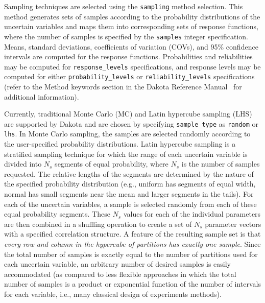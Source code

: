 Sampling techniques are selected using the \texttt{sampling}
method selection. This method generates sets of samples according to
the probability distributions of the uncertain variables and maps them
into corresponding sets of response functions, where the number of
samples is specified by the \texttt{samples} integer specification.
Means, standard deviations, coefficients of variation (COVs), and 95\%
confidence intervals are computed for the response functions.
Probabilities and reliabilities may be computed for 
\texttt{response\_levels} specifications, and response levels may be
computed for either \texttt{probability\_levels} or
\texttt{reliability\_levels} specifications (refer to the Method
keywords section in the Dakota Reference Manual~\cite{RefMan} for
additional information).

Currently, traditional Monte Carlo (MC) and Latin hypercube sampling
(LHS) are supported by Dakota and are chosen by specifying
\texttt{sample\_type} as \texttt{random} or \texttt{lhs}. In Monte
Carlo sampling, the samples are selected randomly according to the
user-specified probability distributions. Latin hypercube sampling is
a stratified sampling technique for which the range of each uncertain
variable is divided into $N_{s}$ segments of equal probability, where
$N_{s}$ is the number of samples requested. The relative lengths of
the segments are determined by the nature of the specified probability
distribution (e.g., uniform has segments of equal width, normal has
small segments near the mean and larger segments in the tails). For
each of the uncertain variables, a sample is selected randomly from
each of these equal probability segments. These $N_{s}$ values for
each of the individual parameters are then combined in a shuffling
operation to create a set of $N_{s}$ parameter vectors with a
specified correlation structure. A feature of the resulting sample set
is that 
\emph{every row and column in the hypercube of partitions has exactly one sample}.
Since the total number of samples is exactly equal
to the number of partitions used for each uncertain variable, an
arbitrary number of desired samples is easily accommodated (as
compared to less flexible approaches in which the total number of
samples is a product or exponential function of the number of
intervals for each variable, i.e., many classical design of
experiments methods).

